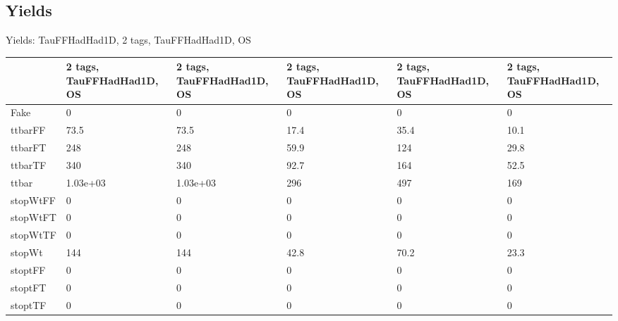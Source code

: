 
\subsection{Yields}

\begin{frame}{Yields: TauFFHadHad1D, 2 tags, TauFFHadHad1D, OS}
\begin{center}
  \begin{tabular}{l| >{\centering\let\newline\\\arraybackslash\hspace{0pt}}m{1.4cm}| >{\centering\let\newline\\\arraybackslash\hspace{0pt}}m{1.4cm}| >{\centering\let\newline\\\arraybackslash\hspace{0pt}}m{1.4cm}| >{\centering\let\newline\\\arraybackslash\hspace{0pt}}m{1.4cm}| >{\centering\let\newline\\\arraybackslash\hspace{0pt}}m{1.4cm}}
    & 2 tags, TauFFHadHad1D, OS & 2 tags, TauFFHadHad1D, OS & 2 tags, TauFFHadHad1D, OS & 2 tags, TauFFHadHad1D, OS & 2 tags, TauFFHadHad1D, OS \\
 \hline \hline
    Fake& 0 & 0 & 0 & 0 & 0 \\
 \hline
    ttbarFF& 73.5 & 73.5 & 17.4 & 35.4 & 10.1 \\
 \hline
    ttbarFT& 248 & 248 & 59.9 & 124 & 29.8 \\
 \hline
    ttbarTF& 340 & 340 & 92.7 & 164 & 52.5 \\
 \hline
    ttbar& 1.03e+03 & 1.03e+03 & 296 & 497 & 169 \\
 \hline
    stopWtFF& 0 & 0 & 0 & 0 & 0 \\
 \hline
    stopWtFT& 0 & 0 & 0 & 0 & 0 \\
 \hline
    stopWtTF& 0 & 0 & 0 & 0 & 0 \\
 \hline
    stopWt& 144 & 144 & 42.8 & 70.2 & 23.3 \\
 \hline
    stoptFF& 0 & 0 & 0 & 0 & 0 \\
 \hline
    stoptFT& 0 & 0 & 0 & 0 & 0 \\
 \hline
    stoptTF& 0 & 0 & 0 & 0 & 0 \\

\end{tabular}
\end{center}
\end{frame}
